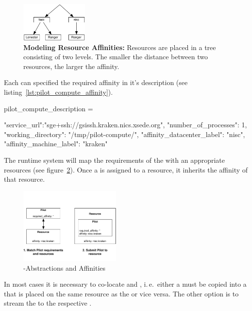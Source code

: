\documentclass[conference]{IEEEtran}
\begin{document}
\begin{figure}[t]
	\centering
		\includegraphics[width=0.3\textwidth]{figures/resource-topologies.pdf}
	\caption{\textbf{Modeling Resource Affinities:} Resources are placed in a 
	tree consisting of two levels. The smaller the distance between two 
	resources, the larger the affinity.}
	\label{fig:figures_resource-topologies}
\end{figure}

Each \pilot can specified the required affinity in it's description (see
listing~\ref{lst:pilot_compute_affinity}).

\begin{code}[
caption={Creation of a \textit{PilotCompute} on the specified  compute
resource endpoint.},
label={lst:pilot_compute_affinity}]
pilot_compute_description = 

{
    "service_url":"sge+ssh://gsissh.kraken.nics.xsede.org",
    "number_of_processes": 1,                             
    "working_directory": "/tmp/pilot-compute/",
    "affinity_datacenter_label": "nisc",              
    "affinity_machine_label": "kraken" 
}
\end{code}

The runtime system will map the requirements of the \pilot with an appropriate
resources (see figure~\ref{fig:figures_pilot-affinities}). Once a \pilot is
assigned to a resource, it inherits the affinity of that resource.

\begin{figure}[t]
	\centering
	\includegraphics[width=0.45\textwidth]{figures/pilot-affinities.pdf}
	\caption{\pilot-Abstractions and Affinities}
	\label{fig:figures_pilot-affinities}
\end{figure}


In most cases it is necessary to co-locate \cus and \dus, i.\,e.\ either a \du
must be copied into a \pd that is placed on the same resource as the \pj or
vice versa. The other option is to stream the \du to the respective \cu.
\end{document}
